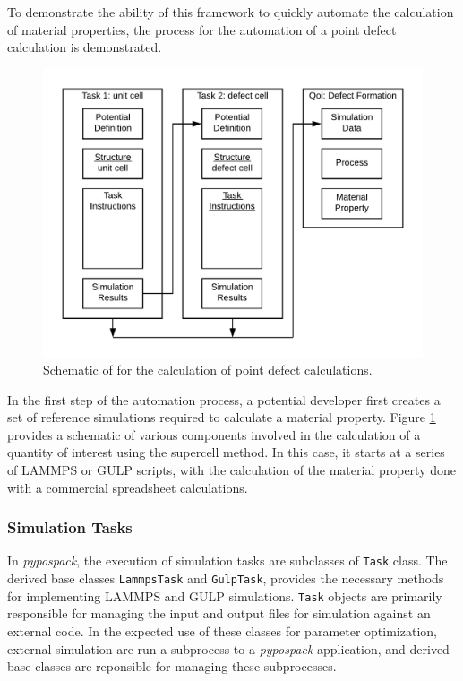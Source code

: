 To demonstrate the ability of this framework to quickly automate the calculation of material properties, the process for the automation of a point defect calculation is demonstrated.

\begin{figure}[ht]
	\label{fig_point_defect_calculation}
	\centering
	\includegraphics[width=5in]{chapter6/img/fig_point_defect}
	\caption{Schematic of for the calculation of point defect calculations.}
\end{figure}

In the first step of the automation process, a potential developer first creates a set of reference simulations required to calculate a material property.  Figure \ref{fig_point_defect_calculation} provides a schematic of various components involved in the calculation of a quantity of interest using the supercell method.  In this case, it starts at a series of LAMMPS or GULP scripts, with the calculation of the material property done with a commercial spreadsheet calculations.

\subsubsection{Simulation Tasks}

In \emph{pypospack}, the execution of simulation tasks are subclasses of \verb|Task| class.  The derived base classes \verb|LammpsTask| and \verb|GulpTask|, provides the necessary methods for implementing LAMMPS and GULP simulations. \verb|Task| objects are primarily responsible for managing the input and output files for simulation against an external code.  In the expected use of these classes for parameter optimization, external simulation are run a subprocess to a \emph{pypospack} application, and derived base classes are reponsible for managing these subprocesses.


